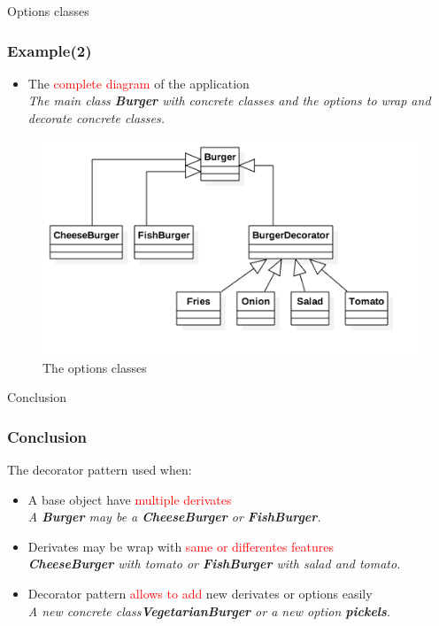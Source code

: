 \documentclass{beamer}
\begin{document}
  \begin{frame}{Options classes}
    \frametitle{Example(2)}
    \begin{itemize}
      \item The \textcolor{red}{complete diagram} of the application\\
      \textit{The main class \textbf{Burger} with concrete classes and the options to wrap and decorate concrete classes.}
    \end{itemize}
    \begin{figure}[!b]
      \centering
      \includegraphics[scale=0.4]{Burger}
      \caption{The options classes}
    \end{figure}
  \end{frame}

  \begin{frame}{Conclusion}
    \frametitle{Conclusion}
    The decorator pattern used when:
    \begin{itemize}
      \item A base object have \textcolor{red}{multiple derivates} \\
      \textit{A \textbf{Burger} may be a \textbf{CheeseBurger} or \textbf{FishBurger}.}
      \item Derivates may be wrap with \textcolor{red}{same or differentes features} \\
      \textit{\textbf{CheeseBurger} with tomato or \textbf{FishBurger} with salad and tomato.}
      \item Decorator pattern \textcolor{red}{allows to add} new derivates or options easily \\
      \textit{A new concrete class\textbf{VegetarianBurger} or a new option \textbf{pickels}.}
    \end{itemize}
  \end{frame}
\end{document}
